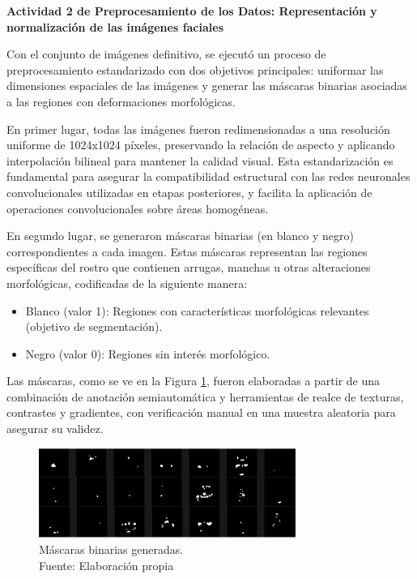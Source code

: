 \textbf{Actividad 2 de Preprocesamiento de los Datos: Representación y normalización de las imágenes faciales}

Con el conjunto de imágenes definitivo, se ejecutó un proceso de preprocesamiento estandarizado con dos objetivos principales: uniformar las dimensiones espaciales de las imágenes y generar las máscaras binarias asociadas a las regiones con deformaciones morfológicas.

En primer lugar, todas las imágenes fueron redimensionadas a una resolución uniforme de 1024x1024 píxeles, preservando la relación de aspecto y aplicando interpolación bilineal para mantener la calidad visual. Esta estandarización es fundamental para asegurar la compatibilidad estructural con las redes neuronales convolucionales utilizadas en etapas posteriores, y facilita la aplicación de operaciones convolucionales sobre áreas homogéneas.

En segundo lugar, se generaron máscaras binarias (en blanco y negro) correspondientes a cada imagen. Estas máscaras representan las regiones específicas del rostro que contienen arrugas, manchas u otras alteraciones morfológicas, codificadas de la siguiente manera:

\begin{itemize}
    \item Blanco (valor 1): Regiones con características morfológicas relevantes (objetivo de segmentación).   
    \item Negro (valor 0): Regiones sin interés morfológico.
\end{itemize} 

Las máscaras, como se ve en la Figura \ref{4:fig2}, fueron elaboradas a partir de una combinación de anotación semiautomática y herramientas de realce de texturas, contrastes y gradientes, con verificación manual en una muestra aleatoria para asegurar su validez.

\begin{figure}[h]
	\begin{center}
		\includegraphics[width=0.75\textwidth]{4/figures/mascaras.png}
		\caption[Máscaras binarias generadas]{Máscaras binarias generadas.\\
		Fuente: Elaboración propia}
		\label{4:fig2}
	\end{center}
\end{figure}

